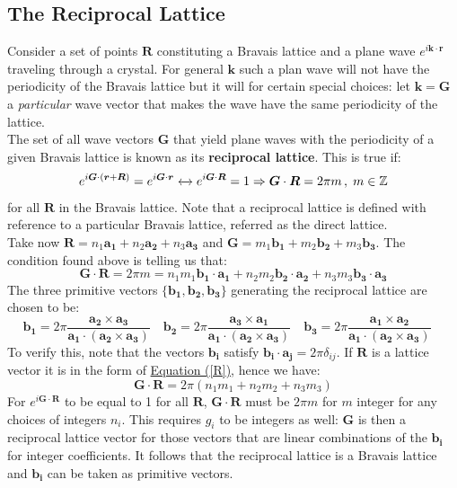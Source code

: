 \documentclass[10.75pt,a4paper,openright,bottom=2cm]{article}
\renewcommand{\Vec}[1]{\boldsymbol{#1}}
\begin{document}
\subsection{The Reciprocal Lattice}
Consider a set of points $\Vec{R}$ constituting a Bravais lattice and a plane wave $e^{i\Vec{k}\cdot\Vec{r}}$ traveling through a crystal. For general $\Vec{k}$ such a plan wave will not have the periodicity of the Bravais lattice but it will for certain special choices: let $\Vec{k}=\Vec{G}$ a \textit{particular} wave vector that makes the wave have the same periodicity of the lattice.\\
The set of all wave vectors $\Vec{G}$ that yield plane waves with the periodicity of a given Bravais lattice is known as its \textbf{reciprocal lattice}. This is true if:
\[
e^{i\Vec{G}\cdot(\Vec{r}+\Vec{R})}=e^{i\Vec{G}\cdot\Vec{r}}\xleftrightarrow{}e^{i\Vec{G}\cdot\Vec{R}}=1\Rightarrow\Vec{G}\cdot\Vec{R}=2\pi m\,,\;m\in\mathbb{Z}
\]
for all $\Vec{R}$ in the Bravais lattice. Note that a reciprocal lattice is defined with reference to a particular Bravais lattice, referred as the direct lattice.\\
Take now $\Vec{R}=n_1\Vec{a_1}+n_2\Vec{a_2}+n_3\Vec{a_3}$ and $\Vec{G}=m_1\Vec{b_1}+m_2\Vec{b_2}+m_3\Vec{b_3}$. The condition found above is telling us that:
\[
\Vec{G}\cdot\Vec{R}=2\pi m=n_1m_1\Vec{b_1}\cdot\Vec{a_1}+n_2m_2\Vec{b_2}\cdot\Vec{a_2}+n_3m_3\Vec{b_3}\cdot\Vec{a_3}
\]
The three primitive vectors $\{\Vec{b_1},\Vec{b_2},\Vec{b_3}\}$ generating the reciprocal lattice are chosen to be:
\[
\Vec{b_1}=2\pi\frac{\Vec{a_2}\times\Vec{a_3}}{\Vec{a_1}\cdot(\Vec{a_2}\times\Vec{a_3})} \quad
\Vec{b_2}=2\pi\frac{\Vec{a_3}\times\Vec{a_1}}{\Vec{a_1}\cdot(\Vec{a_2}\times\Vec{a_3})}\quad
\Vec{b_3}=2\pi\frac{\Vec{a_1}\times\Vec{a_2}}{\Vec{a_1}\cdot(\Vec{a_2}\times\Vec{a_3})}\quad
\]
To verify this, note that the vectors $\Vec{b_i}$ satisfy $\Vec{b_i}\cdot\Vec{a_j}=2\pi\delta_{ij}$. If $\Vec{R}$ is a lattice vector it is in the form of \hyperref[R]{Equation (\ref{R})}, hence we have:
\[
\Vec{G}\cdot\Vec{R}=2\pi(n_1m_1+n_2m_2+n_3m_3)
\]
For $e^{i\Vec{G}\cdot\Vec{R}}$ to be equal to 1 for all $\Vec{R}$, $\Vec{G}\cdot\Vec{R}$ must be $2\pi m$ for $m$ integer for any choices of integers $n_i$. This requires $g_i$ to be integers as well: $\Vec{G}$ is then a reciprocal lattice vector for those vectors that are linear combinations of the $\Vec{b_i}$ for integer coefficients. It follows that the reciprocal lattice is a Bravais lattice and $\Vec{b_i}$ can be taken as primitive vectors.\\
\end{document}
